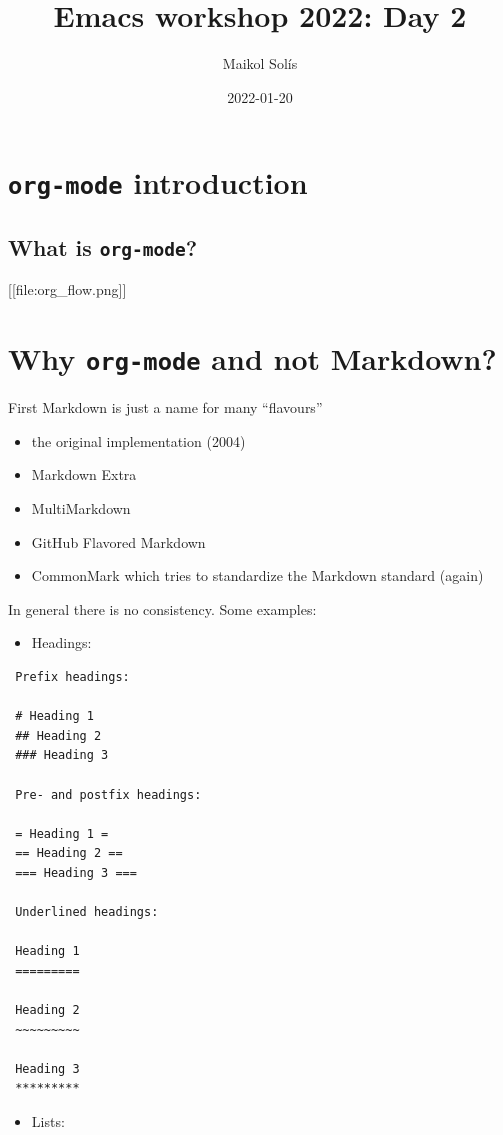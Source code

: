 \documentclass[11pt]{article}
\author{Maikol Solís}
\date{2022-01-20}
\title{Emacs workshop 2022: Day 2}
\begin{document}
\section{\texttt{org-mode} introduction}
\label{sec:org42009e8}

\subsection{What is \texttt{org-mode}?}
\label{sec:org0344811}


[[file:org_flow.png]]

\section{Why \texttt{org-mode} and not Markdown?}
\label{sec:orgfef2989}

First Markdown is just a name for many ``flavours''
\begin{itemize}
\item the original implementation (2004)
\item Markdown Extra
\item MultiMarkdown
\item GitHub Flavored Markdown
\item CommonMark which tries to standardize the Markdown standard (again)
\end{itemize}

In general there is no consistency. Some examples:

\begin{itemize}
\item Headings:
\end{itemize}

\begin{verbatim}
 Prefix headings:

 # Heading 1
 ## Heading 2
 ### Heading 3

 Pre- and postfix headings:

 = Heading 1 =
 == Heading 2 ==
 === Heading 3 ===

 Underlined headings:

 Heading 1
 =========

 Heading 2
 ~~~~~~~~~

 Heading 3
 *********
\end{verbatim}

\begin{itemize}
\item Lists:
\end{itemize}
\end{document}
